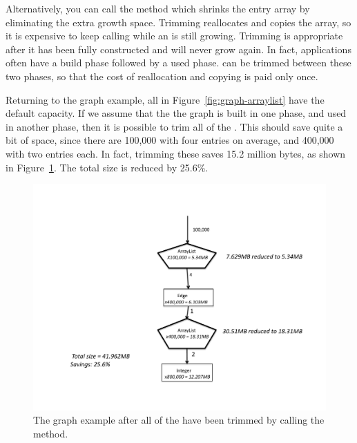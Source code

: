  Alternatively, you can call the  method which shrinks the
 entry array by eliminating the extra growth space. Trimming reallocates and
 copies the array, so it is expensive to keep calling  while an
  is still growing. Trimming is appropriate after
 it has been fully constructed and will never grow again. In fact, applications
 often have a build phase followed by a used phase. 
  can be trimmed
  between these two phases, so that the cost of reallocation and copying is
  paid only once.
 
 Returning to the graph example, all
  in Figure~\ref{fig:graph-arraylist} have the default
 capacity. If we assume that the the graph is built in one phase, and used in
 another phase, then it is possible to trim all of the .
 This should save quite a bit of space, since there are 100,000
  with four entries on average, and 400,000
  with two entries each. In fact, trimming these
  saves 15.2 million bytes, as shown in
 Figure~\ref{fig:trimmed-graph}. The total size is reduced by 25.6\%.

 \begin{figure}
  \centering
 \includegraphics[width=.80\textwidth]{part1/Figures/collections/trimmed-graph.pdf}
  \caption{The graph example after all of the  have been
  trimmed by calling the  method.}
  \label{fig:trimmed-graph}
\end{figure}
 
